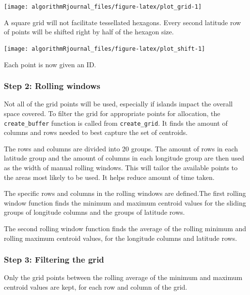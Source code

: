 \begin{Schunk}

\texttt{[image: algorithmRjournal\_files/figure-latex/plot\_grid-1]} \end{Schunk}

A square grid will not facilitate tessellated hexagons. Every second
latitude row of points will be shifted right by half of the hexagon
size.

\begin{Schunk}

\texttt{[image: algorithmRjournal\_files/figure-latex/plot\_shift-1]} \end{Schunk}

Each point is now given an ID.

\hypertarget{step-2-rolling-windows}{%
\subsubsection{Step 2: Rolling windows}\label{step-2-rolling-windows}}

Not all of the grid points will be used, especially if islands impact
the overall space covered. To filter the grid for appropriate points for
allocation, the \texttt{create\_buffer} function is called from
\texttt{create\_grid}. It finds the amount of columns and rows needed to
best capture the set of centroids.

The rows and columns are divided into 20 groups. The amount of rows in
each latitude group and the amount of columns in each longitude group
are then used as the width of manual rolling windows. This will tailor
the available points to the areas most likely to be used. It helps
reduce amount of time taken.

The specific rows and columns in the rolling windows are defined.The
first rolling window function finds the minimum and maximum centroid
values for the sliding groups of longitude columns and the groups of
latitude rows.

The second rolling window function finds the average of the rolling
minimum and rolling maximum centroid values, for the longitude columns
and latitude rows.

\hypertarget{step-3-filtering-the-grid}{%
\subsubsection{Step 3: Filtering the
grid}\label{step-3-filtering-the-grid}}

Only the grid points between the rolling average of the minimum and
maximum centroid values are kept, for each row and column of the grid.

